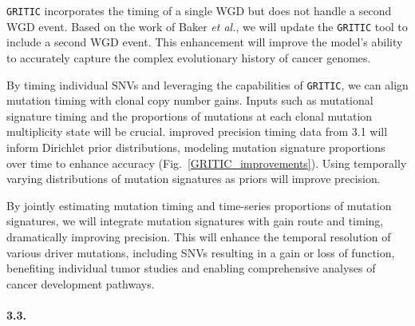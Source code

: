 \texttt{GRITIC} incorporates the timing of a single WGD but does not handle a second WGD event. 
Based on the work of Baker \textit{et al.}, we will update the \texttt{GRITIC} tool to include a second WGD event. 
This enhancement will improve the model’s ability to accurately capture the complex evolutionary history of cancer genomes.

\vspace{1em}
\noindent
By timing individual SNVs and leveraging the capabilities of \texttt{GRITIC}, 
we can align mutation timing with clonal copy number gains. 
Inputs such as mutational signature timing and the proportions of mutations at each clonal mutation multiplicity state will be crucial. 
improved precision timing data from 3.1 will inform Dirichlet prior distributions,
modeling mutation signature proportions over time to enhance accuracy (Fig.~\ref{GRITIC_improvements}).
%
Using temporally varying distributions of mutation signatures as priors will improve precision.


\vspace{1em}
\noindent
By jointly estimating mutation timing and time-series proportions of mutation signatures, 
we will integrate mutation signatures with gain route and timing, 
dramatically improving precision. 
This will enhance the temporal resolution of various driver mutations, 
including SNVs resulting in a gain or loss of function, 
benefiting individual tumor studies and enabling comprehensive analyses of 
cancer development pathways.

\paragraph{3.3. \SpecificAimThreeC}

